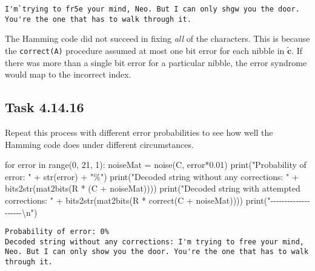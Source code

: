 \documentclass[
  letterpaper,
  DIV=11,
  numbers=noendperiod]{scrartcl}
\newenvironment{Shaded}{\begin{snugshade}}{\end{snugshade}}
\newcommand{\BuiltInTok}[1]{\textcolor[rgb]{0.00,0.23,0.31}{#1}}
\newcommand{\CharTok}[1]{\textcolor[rgb]{0.13,0.47,0.30}{#1}}
\newcommand{\ControlFlowTok}[1]{\textcolor[rgb]{0.00,0.23,0.31}{#1}}
\newcommand{\DecValTok}[1]{\textcolor[rgb]{0.68,0.00,0.00}{#1}}
\newcommand{\FloatTok}[1]{\textcolor[rgb]{0.68,0.00,0.00}{#1}}
\newcommand{\KeywordTok}[1]{\textcolor[rgb]{0.00,0.23,0.31}{#1}}
\newcommand{\NormalTok}[1]{\textcolor[rgb]{0.00,0.23,0.31}{#1}}
\newcommand{\OperatorTok}[1]{\textcolor[rgb]{0.37,0.37,0.37}{#1}}
\newcommand{\StringTok}[1]{\textcolor[rgb]{0.13,0.47,0.30}{#1}}
\begin{document}
\begin{lstlisting}
I'm`trying to fr5e your mind, Neo. But I can only shgw you the door. You're the one that has to walk through it.
\end{lstlisting}

The Hamming code did not succeed in fixing \emph{all} of the characters.
This is because the \texttt{correct(A)} procedure assumed at most one
bit error for each nibble in \(\bm{\tilde{c}}\). If there was more than
a single bit error for a particular nibble, the error syndrome would map
to the incorrect index.

\hypertarget{task-4.14.16}{%
\subsection{Task 4.14.16}\label{task-4.14.16}}

Repeat this process with different error probabilities to see how well
the Hamming code does under different circumstances.

\begin{Shaded}
\begin{Highlighting}[numbers=left,,]
\ControlFlowTok{for}\NormalTok{ error }\KeywordTok{in} \BuiltInTok{range}\NormalTok{(}\DecValTok{0}\NormalTok{, }\DecValTok{21}\NormalTok{, }\DecValTok{1}\NormalTok{):}
\NormalTok{  noiseMat }\OperatorTok{=}\NormalTok{ noise(C, error}\OperatorTok{*}\FloatTok{0.01}\NormalTok{)}
  \BuiltInTok{print}\NormalTok{(}\StringTok{"Probability of error: "} \OperatorTok{+} \BuiltInTok{str}\NormalTok{(error) }\OperatorTok{+} \StringTok{"\%"}\NormalTok{)}
  \BuiltInTok{print}\NormalTok{(}\StringTok{"Decoded string without any corrections: "} \OperatorTok{+}\NormalTok{ bits2str(mat2bits(R }\OperatorTok{*}\NormalTok{ (C }\OperatorTok{+}\NormalTok{ noiseMat))))}
  \BuiltInTok{print}\NormalTok{(}\StringTok{"Decoded string with attempted corrections: "} \OperatorTok{+}\NormalTok{ bits2str(mat2bits(R }\OperatorTok{*}\NormalTok{ correct(C }\OperatorTok{+}\NormalTok{ noiseMat))))}
  \BuiltInTok{print}\NormalTok{(}\StringTok{"{-}{-}{-}{-}{-}{-}{-}{-}{-}{-}{-}{-}{-}{-}{-}{-}{-}{-}{-}{-}}\CharTok{\textbackslash{}n}\StringTok{"}\NormalTok{)}
\end{Highlighting}
\end{Shaded}

\begin{lstlisting}
Probability of error: 0%
Decoded string without any corrections: I'm trying to free your mind, Neo. But I can only show you the door. You're the one that has to walk through it.
\end{lstlisting}
\end{document}

